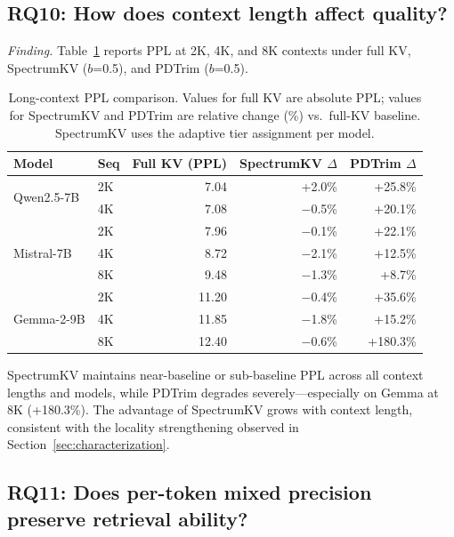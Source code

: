 \documentclass[11pt]{article}
\newcommand{\method}{SpectrumKV}
\newcommand{\ska}{SpectrumKV}
\newcommand{\pct}{\%}
\theoremstyle{definition}
\theoremstyle{plain}
\begin{document}
\subsection{RQ10: How does context length affect quality?}
\label{sec:rq10}

\emph{Finding.}  Table~\ref{tab:long-context} reports PPL at 2K, 4K, and 8K contexts under full KV, \method{} ($b$=0.5), and PDTrim ($b$=0.5).

\begin{table}[t]
\centering
\caption{Long-context PPL comparison.  Values for full KV are absolute PPL; values for \method{} and PDTrim are relative change (\%) vs.\ full-KV baseline.  \method{} uses the adaptive tier assignment per model.}
\label{tab:long-context}
\small
\begin{tabular}{llrrr}
\toprule
Model & Seq & Full KV (PPL) & \ska{} $\Delta$ & PDTrim $\Delta$ \\
\midrule
\multirow{2}{*}{Qwen2.5-7B} & 2K & 7.04 & +2.0\pct{} & +25.8\pct{} \\
 & 4K & 7.08 & $-$0.5\pct{} & +20.1\pct{} \\
\midrule
\multirow{3}{*}{Mistral-7B} & 2K & 7.96 & $-$0.1\pct{} & +22.1\pct{} \\
 & 4K & 8.72 & $-$2.1\pct{} & +12.5\pct{} \\
 & 8K & 9.48 & $-$1.3\pct{} & +8.7\pct{} \\
\midrule
\multirow{3}{*}{Gemma-2-9B} & 2K & 11.20 & $-$0.4\pct{} & +35.6\pct{} \\
 & 4K & 11.85 & $-$1.8\pct{} & +15.2\pct{} \\
 & 8K & 12.40 & $-$0.6\pct{} & +180.3\pct{} \\
\bottomrule
\end{tabular}
\end{table}

\method{} maintains near-baseline or sub-baseline PPL across all context lengths and models, while PDTrim degrades severely---especially on Gemma at 8K (+180.3\pct{}).  The advantage of \method{} grows with context length, consistent with the locality strengthening observed in Section~\ref{sec:characterization}.

\subsection{RQ11: Does per-token mixed precision preserve retrieval ability?}
\label{sec:rq11}
\end{document}

